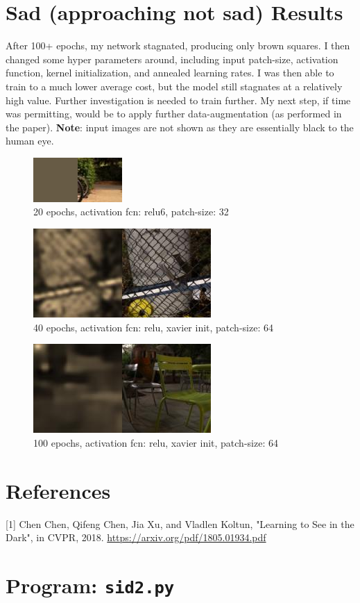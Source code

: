 \documentclass[11pt,a4paper]{article}
\begin{document}
\section*{Sad (approaching not sad) Results}
After 100+ epochs, my network stagnated, producing only brown squares. I then changed some hyper parameters around, including input patch-size, activation function, kernel initialization, and annealed learning rates. I was then able to train to a much lower average cost, but the model still stagnates at a relatively high value. Further investigation is needed to train further. My next step, if time was permitting, would be to apply further data-augmentation (as performed in the paper). \textbf{Note}: input images are not shown as they are essentially black to the human eye. \\
\begin{figure}[h]
	\centering
	\includegraphics[width=.25\textwidth]{../logs/0090_RELU6.jpg}
	\caption{20 epochs, activation fcn: relu6, patch-size: 32}
\end{figure}
\begin{figure}[h]
	\centering
	\includegraphics[width=.25\textwidth]{../logs/0040_RELUX.jpg}
	\caption{40 epochs, activation fcn: relu, xavier init, patch-size: 64}
\end{figure}
\begin{figure}[h]
	\centering
	\includegraphics[width=.25\textwidth]{../logs/0100_CHAIR.jpg}
	\caption{100 epochs, activation fcn: relu, xavier init, patch-size: 64}
\end{figure}

\section*{References}
[1] Chen Chen, Qifeng Chen, Jia Xu, and Vladlen Koltun, "Learning to See in the Dark", in CVPR, 2018. \url{https://arxiv.org/pdf/1805.01934.pdf}

\pagebreak
\section*{Program: \texttt{sid2.py}}



\pagebreak
\end{document}

